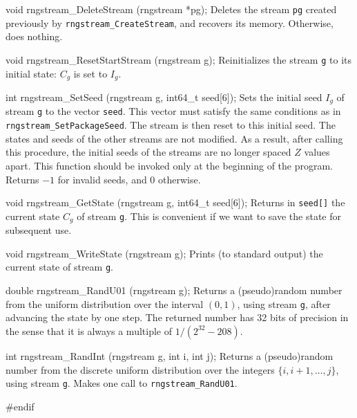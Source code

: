 void rngstream_DeleteStream (rngstream *pg);
\endcode
 \tab Deletes the stream {\tt *pg} created previously 
  by {\tt rngstream\_CreateStream}, and recovers its memory.
  Otherwise, does nothing. 
 \endtab
\code

void rngstream_ResetStartStream (rngstream g);
\endcode
 \tab Reinitializes the stream {\tt g} to its initial state:
   $C_g$ is set to $I_g$.
 \endtab
\code

int rngstream_SetSeed (rngstream g, int64_t seed[6]);
\endcode
 \tab  Sets the initial seed $I_g$ of stream {\tt g}
  to the vector {\tt seed}.  This vector must satisfy the same 
  conditions as in {\tt rngstream\_SetPackageSeed}.
  The stream is then reset to this initial seed.
  The states and seeds of the other streams are not modified.
  As a result, after calling this procedure, the initial seeds
  of the streams are no longer spaced $Z$ values apart.
  This function should be invoked only at the beginning of the program. 
  Returns $-1$ for invalid seeds, and 0 otherwise.
 \endtab
\code

void rngstream_GetState (rngstream g, int64_t seed[6]);
\endcode
 \tab Returns in {\tt seed[]} the current state $C_g$ of stream {\tt g}.
  This is convenient if we want to save the state for subsequent use.  
 \endtab
\code

void rngstream_WriteState (rngstream g);
\endcode
 \tab Prints (to standard output) the current state of stream {\tt g}.
 \endtab
\code

double rngstream_RandU01 (rngstream g);
\endcode
 \tab Returns a (pseudo)random number from the uniform distribution
   over the interval $(0,1)$, using stream {\tt g}, 
   after advancing the state by one step.  
   The returned number has 32 bits of precision in the sense that it is
   always a multiple of $1/(2^{32}-208)$.
 \endtab
\code

int rngstream_RandInt (rngstream g, int i, int j);
\endcode
 \tab Returns a (pseudo)random number from the discrete uniform 
   distribution over the integers $\{i,i+1,\dots,j\}$, using stream {\tt g}.  
   Makes one call to {\tt rngstream\_RandU01}.
 \endtab
\code\hide

#endif
\endhide
\endcode

